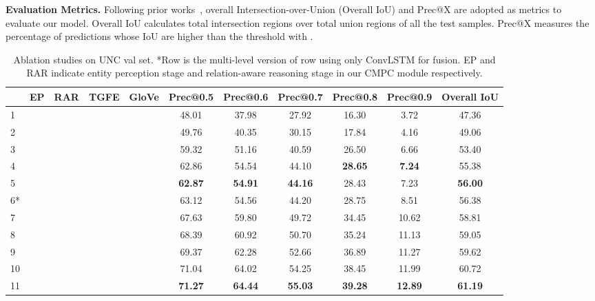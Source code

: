 \documentclass[10pt,twocolumn,letterpaper]{article}
\begin{document}
\textbf{Evaluation Metrics. }Following prior works~\cite{hu2016segmentation}\cite{ye2019cross}\cite{chen2019see}, overall Intersection-over-Union (Overall IoU) and Prec@X are adopted as metrics to evaluate our model. 
Overall IoU calculates total intersection regions over total union regions of all the test samples. 
Prec@X measures the percentage of predictions whose IoU are higher than the threshold  with .

\begin{table*}[t]
   \centering
   \begin{tabular}{l|cccc|ccccc|c}
       \hline
        & EP & RAR & TGFE & GloVe & Prec@0.5 & Prec@0.6 & Prec@0.7 & Prec@0.8  & Prec@0.9  & Overall IoU \\
       \hline
       1& & & & &  48.01 & 37.98 & 27.92 & 16.30 & 3.72 & 47.36 \\
      2 &  & & & & 49.76 & 40.35 & 30.15 & 17.84 & 4.16 & 49.06 \\
       3 & &  & & & 59.32 & 51.16 & 40.59 & 26.50 & 6.66 & 53.40 \\
       4 &  &  & & & 62.86 & 54.54 & 44.10 & \textbf{28.65} & \textbf{7.24} & 55.38 \\
       5 &  &  & &  & \textbf{62.87} & \textbf{54.91} & \textbf{44.16} & 28.43 & 7.23 & \textbf{56.00} \\
      \hline
      6* & & &  & & 63.12 & 54.56 & 44.20 & 28.75 & 8.51 & 56.38 \\
       7 & & &  & & 67.63 & 59.80 & 49.72 & 34.45 & 10.62 & 58.81 \\
       8 &  & &  & & 68.39 & 60.92 & 50.70 & 35.24 & 11.13 & 59.05 \\
      9 & &  &  & & 69.37 & 62.28 & 52.66 & 36.89 & 11.27 & 59.62 \\
        10 &  &  &  & & 71.04 & 64.02 & 54.25 & 38.45 & 11.99 & 60.72 \\
        11 &  &  &  &  & \textbf{71.27} & \textbf{64.44} & \textbf{55.03} & \textbf{39.28} & \textbf{12.89} & \textbf{61.19} \\
       \hline
   \end{tabular}
   \caption{Ablation studies on UNC val set. *Row  is the multi-level version of row  using only ConvLSTM for fusion. 
   EP and RAR indicate entity perception stage and relation-aware reasoning stage in our CMPC module respectively.}
   \label{tab:cmpc}
\end{table*}
\end{document}
